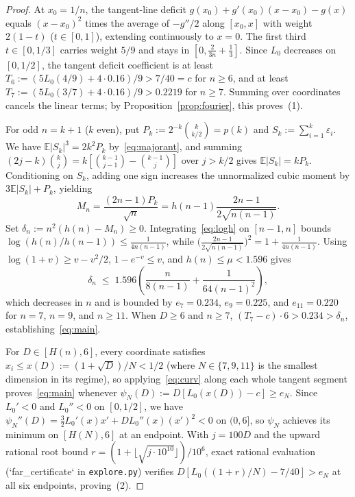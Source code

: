 \documentclass[11pt]{article}
\theoremstyle{plain}
\theoremstyle{definition}
\theoremstyle{remark}
\begin{document}
\begin{proof}
At $x_0 = 1/n$, the tangent-line deficit $g(x_0) + g'(x_0)(x - x_0) - g(x)$ equals $(x - x_0)^2$ times the average of $-g''/2$ along $[x_0, x]$ with weight $2(1 - t)$ ($t \in [0, 1]$), extending continuously to $x = 0$.
The first third $t \in [0, 1/3]$ carries weight $5/9$ and stays in $[0, \frac{2}{3n} + \frac{1}{3}]$.
Since $L_0$ decreases on $[0, 1/2]$, the tangent deficit coefficient is at least $T_6 := (5L_0(4/9) + 4 \cdot 0.16)/9 > 7/40 = c$ for $n \ge 6$, and at least $T_7 := (5L_0(3/7) + 4 \cdot 0.16)/9 > 0.2219$ for $n \ge 7$.
Summing over coordinates cancels the linear terms; by Proposition~\ref{prop:fourier}, this proves~(1).

For odd $n = k + 1$ ($k$ even), put $P_k := 2^{-k}\binom{k}{k/2} = p(k)$ and $S_k := \sum_{i=1}^k \varepsilon_i$.
We have $\mathbb{E}|S_k|^3 = 2k^2 P_k$ by~\eqref{eq:majorant}, and summing $(2j - k)\binom{k}{j} = k[\binom{k-1}{j-1} - \binom{k-1}{j}]$ over $j > k/2$ gives $\mathbb{E}|S_k| = k P_k$.
Conditioning on $S_k$, adding one sign increases the unnormalized cubic moment by $3\mathbb{E}|S_k| + P_k$, yielding
\[
M_n = \frac{(2n - 1)P_k}{\sqrt{n}} = h(n - 1)\frac{2n - 1}{2\sqrt{n(n - 1)}}.
\]
Set $\delta_n := n^2(h(n) - M_n) \ge 0$.
Integrating~\eqref{eq:logh} on $[n - 1, n]$ bounds $\log(h(n)/h(n-1)) \le \frac{1}{4n(n-1)}$, while $\bigl(\frac{2n-1}{2\sqrt{n(n-1)}}\bigr)^2 = 1 + \frac{1}{4n(n-1)}$.
Using $\log(1 + v) \ge v - v^2/2$, $1 - e^{-v} \le v$, and $h(n) \le \mu < 1.596$ gives
\begin{equation}\label{eq:delta}
\delta_n \;\le\; 1.596\left(\frac{n}{8(n - 1)} + \frac{1}{64(n - 1)^2}\right),
\end{equation}
which decreases in $n$ and is bounded by $e_7 = 0.234$, $e_9 = 0.225$, and $e_{11} = 0.220$ for $n = 7$, $n = 9$, and $n \ge 11$.
When $D \ge 6$ and $n \ge 7$, $(T_7 - c) \cdot 6 > 0.234 > \delta_n$, establishing~\eqref{eq:main}.

For $D \in [H(n), 6]$, every coordinate satisfies $x_i \le x(D) := (1 + \sqrt{D})/N < 1/2$ (where $N \in \{7, 9, 11\}$ is the smallest dimension in its regime), so applying~\eqref{eq:curv} along each whole tangent segment proves~\eqref{eq:main} whenever $\psi_N(D) := D[L_0(x(D)) - c] \ge e_N$.
Since $L_0' < 0$ and $L_0'' < 0$ on $[0, 1/2]$, we have $\psi_N''(D) = \frac{3}{2}L_0'(x)x' + D L_0''(x)(x')^2 < 0$ on $(0, 6]$, so $\psi_N$ achieves its minimum on $[H(N), 6]$ at an endpoint.
With $j = 100 D$ and the upward rational root bound $r = (1 + \lfloor\sqrt{j \cdot 10^{10}}\rfloor)/10^6$, exact rational evaluation (`far\_certificate` in \texttt{explore.py}) verifies $D[L_0((1 + r)/N) - 7/40] > e_N$ at all six endpoints, proving~(2).
\end{proof}
\end{document}
